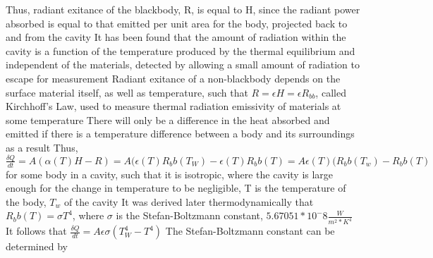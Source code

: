 \documentclass[11 pt, twoside]{article}
\newenvironment{outline*}
{
	\begin{outline}[enumerate]
	}
	{\end{outline}
}
\begin{document}
\begin{outline*}
\3 Thus, radiant exitance of the blackbody, R, is equal to H, since the radiant power absorbed is equal to that emitted per unit area for the body, projected back to and from the cavity
\2 It has been found that the amount of radiation within the cavity is a function of the temperature produced by the thermal equilibrium and independent of the materials, detected by allowing a small amount of radiation to escape for measurement
\2 Radiant exitance of a non-blackbody depends on the surface material itself, as well as temperature, such that $R = \epsilon H = \epsilon R_{bb}$, called Kirchhoff's Law, used to measure thermal radiation emissivity of materials at some temperature
\2 There will only be a difference in the heat absorbed and emitted if there is a temperature difference between a body and its surroundings as a result
\3 Thus, $\frac{\delta Q}{dt} = A(\alpha(T) H - R) = A(\epsilon(T) R_bb(T_W) - \epsilon(T) R_bb(T) = A\epsilon(T)(R_bb(T_w) - R_bb(T)$ for some body in a cavity, such that it is isotropic, where the cavity is large enough for the change in temperature to be negligible, T is the temperature of the body, $T_w$ of the cavity
\2 It was derived later thermodynamically that $R_bb(T) = \sigma T^4$, where $\sigma$ is the Stefan-Boltzmann constant, $5.67051 * 10^-8 \frac{W}{m^2 * K^4}$
\3 It follows that $\frac{\delta Q}{dt} = A\epsilon\sigma(T_W^4 - T^4)$
\3 The Stefan-Boltzmann constant can be determined by
\end{outline*}
\end{document}
